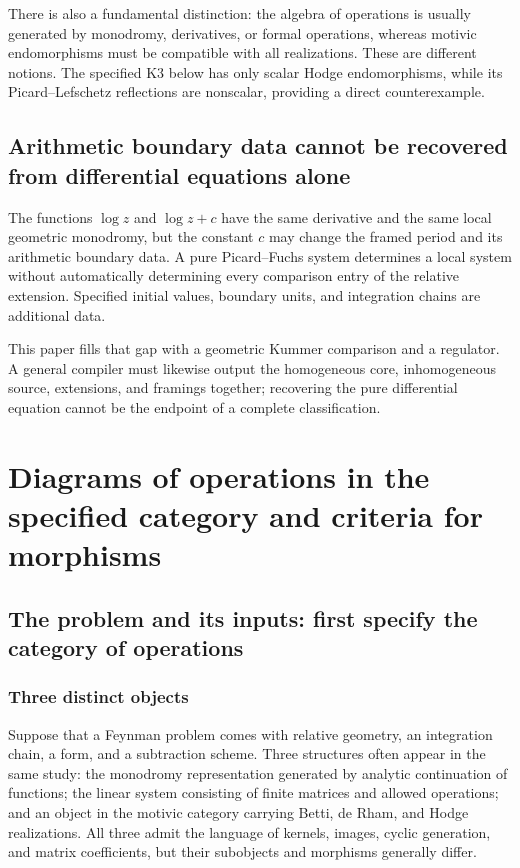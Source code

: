\documentclass[11pt,a4paper,oneside]{article}
\theoremstyle{plain}
\theoremstyle{definition}
\theoremstyle{remark}
\newcommand{\Q}{\mathbb Q}
\newcommand{\C}{\mathbb C}
\newcommand{\End}{\operatorname{End}}
\newcommand{\Hom}{\operatorname{Hom}}
\newcommand{\rank}{\operatorname{rank}}
\newcommand{\im}{\operatorname{im}}
\newcommand{\id}{\operatorname{id}}
\newcommand{\dR}{\mathrm{dR}}
\numberwithin{equation}{section}
\begin{document}
There is also a fundamental distinction: the algebra of operations is usually generated by monodromy, derivatives, or formal operations, whereas motivic endomorphisms must be compatible with all realizations. These are different notions. The specified K3 below has only scalar Hodge endomorphisms, while its Picard--Lefschetz reflections are nonscalar, providing a direct counterexample.


\subsection{Arithmetic boundary data cannot be recovered from differential equations alone}
The functions $\log z$ and $\log z+c$ have the same derivative and the same local geometric monodromy, but the constant $c$ may change the framed period and its arithmetic boundary data. A pure Picard--Fuchs system determines a local system without automatically determining every comparison entry of the relative extension. Specified initial values, boundary units, and integration chains are additional data.

This paper fills that gap with a geometric Kummer comparison and a regulator. A general compiler must likewise output the homogeneous core, inhomogeneous source, extensions, and framings together; recovering the pure differential equation cannot be the endpoint of a complete classification.




\endgroup


\section{Diagrams of operations in the specified category and criteria for morphisms}\label{ch:ops}

\begingroup
\providecommand{\Q}{\mathbb Q}
\providecommand{\C}{\mathbb C}
\providecommand{\dR}{\mathrm{dR}}
\providecommand{\id}{\operatorname{id}}
\providecommand{\im}{\operatorname{im}}
\providecommand{\End}{\operatorname{End}}
\providecommand{\Hom}{\operatorname{Hom}}
\providecommand{\Vis}{\operatorname{Vis}}
\providecommand{\soc}{\operatorname{soc}}
\providecommand{\head}{\operatorname{head}}
\providecommand{\rank}{\operatorname{rank}}
\subsection{The problem and its inputs: first specify the category of operations}
\subsubsection{Three distinct objects}
Suppose that a Feynman problem comes with relative geometry, an integration chain, a form, and a subtraction scheme.
Three structures often appear in the same study: the monodromy representation generated by analytic continuation of functions;
the linear system consisting of finite matrices and allowed operations; and an object in the motivic category carrying Betti, de Rham, and Hodge realizations.
All three admit the language of kernels, images, cyclic generation, and matrix coefficients, but their subobjects and morphisms generally differ.
\end{document}
